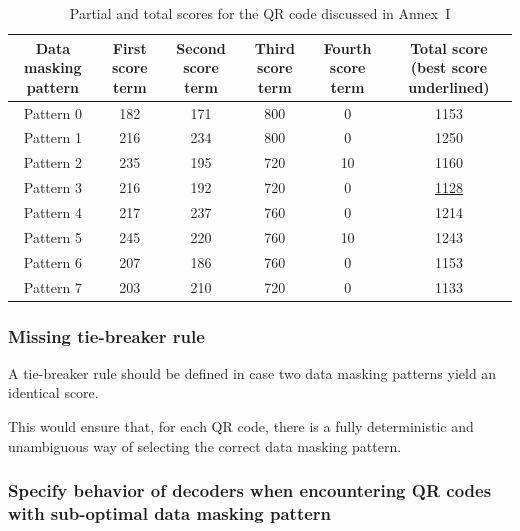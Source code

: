 \documentclass[a4paper,twoside]{article}
\newcommand{\best}[1]{\underline{#1}}
\begin{document}
\begin{table}[h!]
\centering
\tiny
\begin{tabular}{|c|c|c|c|c|c|}
\hline
Data masking pattern & First score term & Second score term & Third score term & Fourth score term & Total score (best score underlined) \\
\hline
Pattern 0            & 182              & 171               & 800              &  0                & 1153        \\
Pattern 1            & 216              & 234               & 800              &  0                & 1250        \\
Pattern 2            & 235              & 195               & 720              & 10                & 1160        \\
Pattern 3            & 216              & 192               & 720              &  0                & \best{1128} \\
Pattern 4            & 217              & 237               & 760              &  0                & 1214        \\
Pattern 5            & 245              & 220               & 760              & 10                & 1243        \\
Pattern 6            & 207              & 186               & 760              &  0                & 1153        \\
Pattern 7            & 203              & 210               & 720              &  0                & 1133        \\
\hline
\end{tabular}
\caption{Partial and total scores for the QR code discussed in Annex~I}
\label{tab:dmp-selection-annex-example}
\end{table}

\subsubsection*{Missing tie-breaker rule}

A tie-breaker rule should be defined in case two data masking patterns yield an identical score.

This would ensure that, for each QR code, there is a fully deterministic and unambiguous way of selecting the
correct data masking pattern.

\subsubsection*{Specify behavior of decoders when encountering QR codes with sub-optimal data masking pattern}
\end{document}
